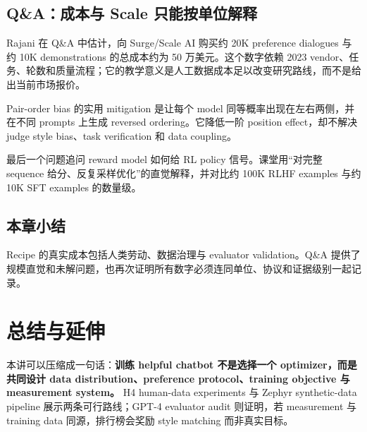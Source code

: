 \documentclass[a4paper]{article}
\begin{document}
\subsection{Q\&A：成本与 Scale 只能按单位解释}

Rajani 在 Q\&A 中估计，向 Surge/Scale AI 购买约 20K preference dialogues 与约 10K demonstrations 的总成本约为 50 万美元。这个数字依赖 2023 vendor、任务、轮数和质量流程；它的教学意义是人工数据成本足以改变研究路线，而不是给出当前市场报价。


Pair-order bias 的实用 mitigation 是让每个 model 同等概率出现在左右两侧，并在不同 prompts 上生成 reversed ordering。它降低一阶 position effect，却不解决 judge style bias、task verification 和 data coupling。


最后一个问题追问 reward model 如何给 RL policy 信号。课堂用“对完整 sequence 给分、反复采样优化”的直觉解释，并对比约 100K RLHF examples 与约 10K SFT examples 的数量级。


\subsection{本章小结}

Recipe 的真实成本包括人类劳动、数据治理与 evaluator validation。Q\&A 提供了规模直觉和未解问题，也再次证明所有数字必须连同单位、协议和证据级别一起记录。

\section{总结与延伸}

本讲可以压缩成一句话：\textbf{训练 helpful chatbot 不是选择一个 optimizer，而是共同设计 data distribution、preference protocol、training objective 与 measurement system。} H4 human-data experiments 与 Zephyr synthetic-data pipeline 展示两条可行路线；GPT-4 evaluator audit 则证明，若 measurement 与 training data 同源，排行榜会奖励 style matching 而非真实目标。
\end{document}
